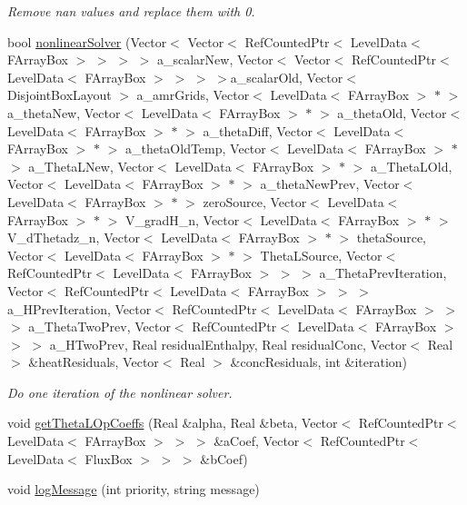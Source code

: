 \begin{DoxyCompactItemize}
\begin{DoxyCompactList}\small\item\em Remove nan values and replace them with 0. \end{DoxyCompactList}\item 
\hypertarget{classamr_mushy_layer_a4b534f6320075017ec12636e721ebf9a}{bool \hyperlink{classamr_mushy_layer_a4b534f6320075017ec12636e721ebf9a}{nonlinear\-Solver} (Vector$<$ Vector$<$ Ref\-Counted\-Ptr$<$ Level\-Data$<$ F\-Array\-Box $>$ $>$ $>$ $>$ a\-\_\-scalar\-New, Vector$<$ Vector$<$ Ref\-Counted\-Ptr$<$ Level\-Data$<$ F\-Array\-Box $>$ $>$ $>$ $>$a\-\_\-scalar\-Old, Vector$<$ Disjoint\-Box\-Layout $>$ a\-\_\-amr\-Grids, Vector$<$ Level\-Data$<$ F\-Array\-Box $>$ $\ast$ $>$ a\-\_\-theta\-New, Vector$<$ Level\-Data$<$ F\-Array\-Box $>$ $\ast$ $>$ a\-\_\-theta\-Old, Vector$<$ Level\-Data$<$ F\-Array\-Box $>$ $\ast$ $>$ a\-\_\-theta\-Diff, Vector$<$ Level\-Data$<$ F\-Array\-Box $>$ $\ast$ $>$ a\-\_\-theta\-Old\-Temp, Vector$<$ Level\-Data$<$ F\-Array\-Box $>$ $\ast$ $>$ a\-\_\-\-Theta\-L\-New, Vector$<$ Level\-Data$<$ F\-Array\-Box $>$ $\ast$ $>$ a\-\_\-\-Theta\-L\-Old, Vector$<$ Level\-Data$<$ F\-Array\-Box $>$ $\ast$ $>$ a\-\_\-theta\-New\-Prev, Vector$<$ Level\-Data$<$ F\-Array\-Box $>$ $\ast$ $>$ zero\-Source, Vector$<$ Level\-Data$<$ F\-Array\-Box $>$ $\ast$ $>$ V\-\_\-grad\-H\-\_\-n, Vector$<$ Level\-Data$<$ F\-Array\-Box $>$ $\ast$ $>$ V\-\_\-d\-Thetadz\-\_\-n, Vector$<$ Level\-Data$<$ F\-Array\-Box $>$ $\ast$ $>$ theta\-Source, Vector$<$ Level\-Data$<$ F\-Array\-Box $>$ $\ast$ $>$ Theta\-L\-Source, Vector$<$ Ref\-Counted\-Ptr$<$ Level\-Data$<$ F\-Array\-Box $>$ $>$ $>$ a\-\_\-\-Theta\-Prev\-Iteration, Vector$<$ Ref\-Counted\-Ptr$<$ Level\-Data$<$ F\-Array\-Box $>$ $>$ $>$ a\-\_\-\-H\-Prev\-Iteration, Vector$<$ Ref\-Counted\-Ptr$<$ Level\-Data$<$ F\-Array\-Box $>$ $>$ $>$ a\-\_\-\-Theta\-Two\-Prev, Vector$<$ Ref\-Counted\-Ptr$<$ Level\-Data$<$ F\-Array\-Box $>$ $>$ $>$ a\-\_\-\-H\-Two\-Prev, Real residual\-Enthalpy, Real residual\-Conc, Vector$<$ Real $>$ \&heat\-Residuals, Vector$<$ Real $>$ \&conc\-Residuals, int \&iteration)}\label{classamr_mushy_layer_a4b534f6320075017ec12636e721ebf9a}

\begin{DoxyCompactList}\small\item\em Do one iteration of the nonlinear solver. \end{DoxyCompactList}\item 
void \hyperlink{classamr_mushy_layer_adada677b759fd1b2e5236b9002e5990c}{get\-Theta\-L\-Op\-Coeffs} (Real \&alpha, Real \&beta, Vector$<$ Ref\-Counted\-Ptr$<$ Level\-Data$<$ F\-Array\-Box $>$ $>$ $>$ \&a\-Coef, Vector$<$ Ref\-Counted\-Ptr$<$ Level\-Data$<$ Flux\-Box $>$ $>$ $>$ \&b\-Coef)
\item 
\hypertarget{classamr_mushy_layer_a117c9ac8cf3066b5826d3cd15d98d84c}{void \hyperlink{classamr_mushy_layer_a117c9ac8cf3066b5826d3cd15d98d84c}{log\-Message} (int priority, string message)}\label{classamr_mushy_layer_a117c9ac8cf3066b5826d3cd15d98d84c}


\end{DoxyCompactItemize}
